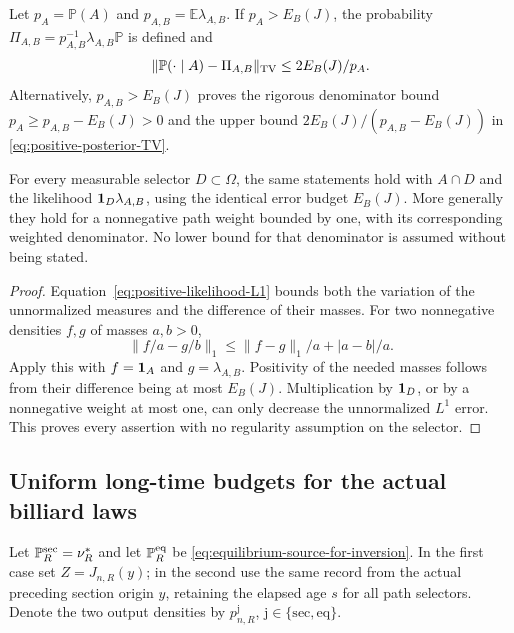 \begin{corollary}
\label{cor:positive-microscopic-posterior}
Let $p_A=\mathbb P(A)$ and $p_{A,B}=\mathbb E\lambda_{A,B}$.
If $p_A>E_B(J)$, the probability
$\Pi_{A,B}=p_{A,B}^{-1}\lambda_{A,B}\mathbb P$ is defined and
\begin{equation}\label{eq:positive-posterior-TV}
 \|\mathbb P(\cdot\mid A)-\Pi_{A,B}\|_{\TV}
                            \le 2E_B(J)/p_A.
\end{equation}
Alternatively, $p_{A,B}>E_B(J)$ proves the rigorous denominator bound
$p_A\ge p_{A,B}-E_B(J)>0$ and the upper bound
$2E_B(J)/(p_{A,B}-E_B(J))$ in \eqref{eq:positive-posterior-TV}.

For every measurable selector $D\subset\Omega$, the same statements
hold with $A\cap D$ and the likelihood $\mathbf1_D\lambda_{A,B}$,
using the identical error budget $E_B(J)$. More generally they hold
for a nonnegative path weight bounded by one, with its corresponding
weighted denominator. No lower bound for that denominator is assumed
without being stated.
\end{corollary}
\begin{proof}
Equation~\eqref{eq:positive-likelihood-L1} bounds both the variation
of the unnormalized measures and the difference of their masses.
For two nonnegative densities $f,g$ of masses $a,b>0$,
\[
 \|f/a-g/b\|_1\le\|f-g\|_1/a+|a-b|/a.
\]
Apply this with $f=\mathbf1_A$ and $g=\lambda_{A,B}$. Positivity of the
needed masses follows from their difference being at most $E_B(J)$.
Multiplication by $\mathbf1_D$, or by a nonnegative weight at most one,
can only decrease the unnormalized $L^1$ error. This proves every
assertion with no regularity assumption on the selector.
\end{proof}

\subsection{Uniform long-time budgets for the actual billiard laws}
Let $\mathbb P_R^{\rm sec}=\nu_R^*$ and let $\mathbb P_R^{\rm eq}$
be \eqref{eq:equilibrium-source-for-inversion}. In the first case set
$Z=J_{n,R}(y)$; in the second use the same record from the actual preceding
section origin $y$, retaining the elapsed age $s$ for all path selectors.
Denote the two output densities by $p_{n,R}^{\mathrm j}$,
$\mathrm j\in\{\mathrm{sec},\mathrm{eq}\}$.

